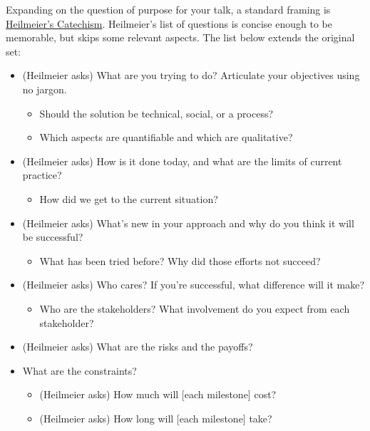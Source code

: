\label{sec:extending-Heilmeier}
Expanding on the question of purpose for your talk, a standard framing is 
\href{https://en.wikipedia.org/wiki/George_H._Heilmeier\%23Heilmeier's_Catechism}{Heilmeier's Catechism}.
Heilmeier's list of questions is concise enough to be memorable, but skips some relevant aspects. The list below extends the original set:
\begin{itemize}
    \item (Heilmeier asks) What are you trying to do? Articulate your objectives using  no jargon.
    \begin{itemize}
        \item Should the solution be technical, social, or a process?
        \item Which aspects are quantifiable and which are qualitative?
    \end{itemize}
    \item (Heilmeier asks) How is it done today, and what are the limits of current practice?
    \begin{itemize}
        \item How did we get to the current situation? 
    \end{itemize}
    \item (Heilmeier asks) What's new in your approach and why do you think it will be successful?
    \begin{itemize}
        \item What has been tried before? Why did those efforts not succeed?
    \end{itemize}
    \item (Heilmeier asks) Who cares? If you're successful, what difference will it make?
    \begin{itemize}
        \item Who are the stakeholders? What involvement do you expect from each stakeholder?
    \end{itemize}
    \item (Heilmeier asks) What are the risks and the payoffs?
    \item What are the constraints?
    \begin{itemize}
        \item (Heilmeier asks) How much will [each milestone] cost?
        \item (Heilmeier asks) How long will [each milestone] take?

\end{itemize}
\end{itemize}

